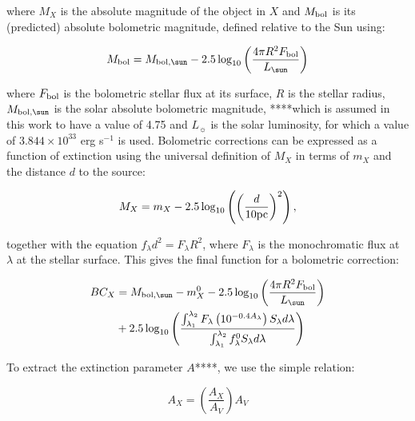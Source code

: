 \documentclass[usenatbib]{mnras}
\begin{document}
where $M_{X}$ is the absolute magnitude of the object in $X$ and $M_{\textnormal{bol}}$ is its (predicted) absolute bolometric magnitude, defined relative to the Sun using:

\begin{equation}
M_{\textnormal{bol}} = M_{\textnormal{bol},\sun} - 2.5 \log_{10} \left( \frac{4\pi R^{2}F_{\textnormal{bol}}}{L_{\sun}} \right)
\label{mbol_sun}
\end{equation}

where  $F_{\textnormal{bol}}$ is the bolometric stellar flux at its surface, $R$ is the stellar radius, $M_{\textnormal{bol},\sun}$ is the solar absolute bolometric magnitude, ****which is assumed in this work to have a value of 4.75 and $L_{\sun}$ is the solar luminosity, for which a value of $3.844 \times 10^{33}$ erg s$^{-1}$ is used. Bolometric corrections can be expressed as a function of extinction using the universal definition of $M_{X}$ in terms of $m_{X}$ and the distance $d$ to the source:

\begin{equation}
M_{X} = m_{X} - 2.5 \log_{10}\left( \left( \frac{d}{10 \textnormal{pc}} \right)^{2} \right),
\label{BC_def}
\end{equation}

together with the equation $f_{\lambda}d^{2}=F_{\lambda}R^{2}$, where $F_{\lambda}$ is the monochromatic flux at $\lambda$ at the stellar surface. This gives the final function for a bolometric correction:

\begin{align}
BC_{X} &= M_{\textnormal{bol},\sun} - m_{X}^{0} - 2.5 \log_{10} \left( \frac{4\pi R^{2}F_{\textnormal{bol}}}{L_{\sun}} \right) \\ &+ 2.5 \log_{10} \left( \frac{\int_{\lambda_{1}}^{\lambda_{2}} F_{\lambda} \left( 10^{-0.4 A_{\lambda}} \right) S_{\lambda} d\lambda}{\int_{\lambda_{1}}^{\lambda_{2}} f_{\lambda}^{0} S_{\lambda} d\lambda} \right)
\label{BC_extinc}
\end{align}


To extract the extinction parameter $A$****, we use the simple relation:

\begin{equation}
A_{X} = \left( \frac{A_{X}}{A_{V}} \right) A_{V}
\label{ratio_eq}
\end{equation}
\end{document}
